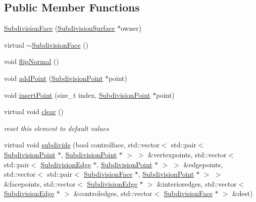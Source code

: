 \subsection*{Public Member Functions}
\begin{DoxyCompactItemize}
\item 
\hyperlink{classShipCADGeometry_1_1SubdivisionFace_a082f81f7a5750f7e53ed5a92ddc82350}{Subdivision\-Face} (\hyperlink{classShipCADGeometry_1_1SubdivisionSurface}{Subdivision\-Surface} $\ast$owner)
\item 
virtual \hyperlink{classShipCADGeometry_1_1SubdivisionFace_a44a0acc598533bf6846e4f7272e5c191}{$\sim$\-Subdivision\-Face} ()
\item 
void \hyperlink{classShipCADGeometry_1_1SubdivisionFace_a16d5e005d1c7c847ccf9ba72b67142fa}{flip\-Normal} ()
\item 
void \hyperlink{classShipCADGeometry_1_1SubdivisionFace_a553df49a1137f89d2df2846ffca74842}{add\-Point} (\hyperlink{classShipCADGeometry_1_1SubdivisionPoint}{Subdivision\-Point} $\ast$point)
\item 
void \hyperlink{classShipCADGeometry_1_1SubdivisionFace_aacd383eb085c4f6b92db89e25be6b3a1}{insert\-Point} (size\-\_\-t index, \hyperlink{classShipCADGeometry_1_1SubdivisionPoint}{Subdivision\-Point} $\ast$point)
\item 
virtual void \hyperlink{classShipCADGeometry_1_1SubdivisionFace_a413ae7e76f559780c8a69e998974fb75}{clear} ()
\begin{DoxyCompactList}\small\item\em reset this element to default values \end{DoxyCompactList}\item 
virtual void \hyperlink{classShipCADGeometry_1_1SubdivisionFace_a934edbf44e524a2ec250f896c3cc182d}{subdivide} (bool controlface, std\-::vector$<$ std\-::pair$<$ \hyperlink{classShipCADGeometry_1_1SubdivisionPoint}{Subdivision\-Point} $\ast$, \hyperlink{classShipCADGeometry_1_1SubdivisionPoint}{Subdivision\-Point} $\ast$ $>$ $>$ \&vertexpoints, std\-::vector$<$ std\-::pair$<$ \hyperlink{classShipCADGeometry_1_1SubdivisionEdge}{Subdivision\-Edge} $\ast$, \hyperlink{classShipCADGeometry_1_1SubdivisionPoint}{Subdivision\-Point} $\ast$ $>$ $>$ \&edgepoints, std\-::vector$<$ std\-::pair$<$ \hyperlink{classShipCADGeometry_1_1SubdivisionFace}{Subdivision\-Face} $\ast$, \hyperlink{classShipCADGeometry_1_1SubdivisionPoint}{Subdivision\-Point} $\ast$ $>$ $>$ \&facepoints, std\-::vector$<$ \hyperlink{classShipCADGeometry_1_1SubdivisionEdge}{Subdivision\-Edge} $\ast$ $>$ \&interioredges, std\-::vector$<$ \hyperlink{classShipCADGeometry_1_1SubdivisionEdge}{Subdivision\-Edge} $\ast$ $>$ \&controledges, std\-::vector$<$ \hyperlink{classShipCADGeometry_1_1SubdivisionFace}{Subdivision\-Face} $\ast$ $>$ \&dest)

\end{DoxyCompactItemize}
